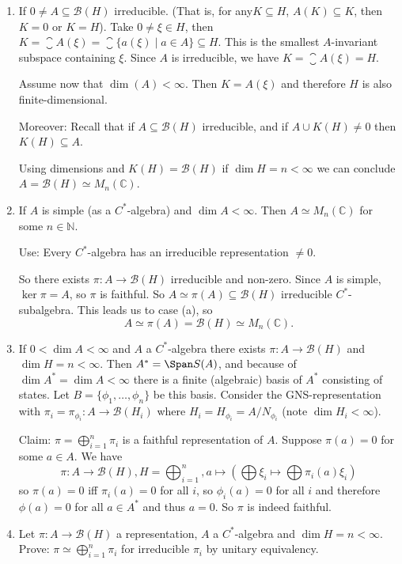 \documentclass[a4paper]{article}
\begin{document}
\begin{exercise}[05-03]
	\begin{enumerate}[label=(\alph*)]
		\item If $0 \neq A \subseteq \mathcal{B}(H)$ irreducible. 
		(That is, for any$K \subseteq H$, $A(K) \subseteq K$, then $K = 0$ or $K = H$).
		Take $0 \neq \xi \in H$, then $K = \closure{A(\xi)} = \closure{\{a(\xi) \mid a \in A\}} \subseteq H$.
		This is the smallest $A$-invariant subspace containing $\xi$.
		Since $A$ is irreducible, we have $K = \closure{A(\xi)} = H$.

		Assume now that $\dim(A) < \infty$.
		Then $K = A(\xi)$ and therefore $H$ is also finite-dimensional.

		Moreover: Recall that if $A \subseteq \mathcal{B}(H)$ irreducible, and if $A \cup K(H) \neq 0$ then $K(H) \subseteq A$.

		Using dimensions and $K(H) = \mathcal{B}(H)$ if $\dim H = n < \infty$ we can conclude $A = \mathcal{B}(H) \simeq M_n(\mathds{C})$.

		\item If $A$ is simple (as a $C^*$-algebra) and $\dim A < \infty$.
		Then $A \simeq M_n(\mathds{C})$ for some $n \in \mathds{N}$.
		
		Use: Every $C^*$-algebra has an irreducible representation $\neq 0$.

		So there exists $\pi: A \to \mathcal{B}(H)$ irreducible and non-zero.
		Since $A$ is simple, $\ker \pi = A$, so $\pi$ is faithful.
		So $A \simeq \pi(A) \subseteq \mathcal{B}(H)$ irreducible $C^*$-subalgebra.
		This leads us to case (a), so
		\begin{equation*}
			A \simeq \pi(A) = \mathcal{B}(H) \simeq M_n(\mathds{C})\text{.}
		\end{equation*}
		\item If $0 < \dim A < \infty$ and $A$ a $C^*$-algebra there exists $\pi: A \to \mathcal{B}(H)$ and $\dim H = n < \infty$.
		Then $A^* = \Span S(A)$, and because of $\dim A^* = \dim A < \infty$ there is a finite (algebraic) basis of $A^*$ consisting of states.
		Let $B = \{ \phi_1, \dots, \phi_n \}$ be this basis.
		Consider the GNS-representation with $\pi_i = \pi_{\phi_i}: A \to \mathcal{B}(H_i)$ where $H_i = H_{\phi_i} = A/N_{\phi_i}$ (note $\dim H_i < \infty$).

		Claim: $\pi = \bigoplus_{i = 1}^n \pi_i$ is a faithful representation of $A$. Suppose $\pi(a) = 0$ for some $a \in A$.
		We have
		\begin{equation*}
			\pi: A \to \mathcal{B}(H), H = \bigoplus_{i = 1}^n, a \mapsto (\bigoplus \xi_i \mapsto \bigoplus \pi_i(a) \xi_i ) 
		\end{equation*}
		so $\pi(a) = 0$ iff $\pi_i(a) = 0$ for all $i$, so $\phi_i(a) = 0$ for all $i$ and therefore $\phi(a) = 0$ for all $a \in A^*$ and thus $a = 0$.
		So $\pi$ is indeed faithful.
		\item Let $\pi: A \to \mathcal{B}(H)$ a representation, $A$ a $C^*$-algebra and $\dim H = n < \infty$.
		Prove: $\pi \simeq \bigoplus_{i = 1}^n \pi_i$ for irreducible $\pi_i$ by unitary equivalency.


\end{enumerate}
\end{exercise}
\end{document}
